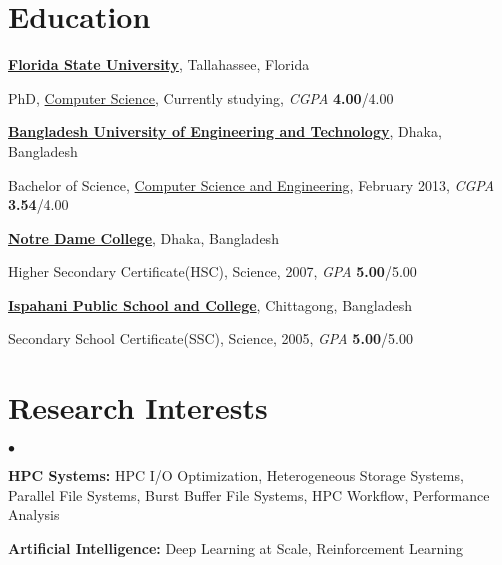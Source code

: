 \documentclass[margin,line]{res}
\newenvironment{list1}{
  \begin{list}{\ding{113}}{%
      \setlength{\itemsep}{0in}
      \setlength{\parsep}{0in} \setlength{\parskip}{0in}
      \setlength{\topsep}{0in} \setlength{\partopsep}{0in} 
      \setlength{\leftmargin}{0.17in}}}{\end{list}}
\newenvironment{list2}{
  \begin{list}{$\bullet$}{%
      \setlength{\itemsep}{0in}
      \setlength{\parsep}{0in} \setlength{\parskip}{0in}
      \setlength{\topsep}{0in} \setlength{\partopsep}{0in} 
      \setlength{\leftmargin}{0.2in}}}{\end{list}}
\begin{document}
\begin{resume}
\section{\sc Education}
{\bf \href{http://www.fsu.edu}{Florida State University}}, Tallahassee, Florida\\
\vspace*{-.15in}
\begin{list1}
\item[] PhD, \href{http://www.cs.fsu.edu/}{Computer Science}, Currently studying, \textit{CGPA} \textbf{4.00}/4.00
\end{list1}
\vspace*{-.15in}
{\bf \href{http://buet.ac.bd}{Bangladesh University of Engineering and Technology}}, Dhaka, Bangladesh\\
\vspace*{-.15in}
\begin{list1}
\item[] Bachelor of Science, \href{http://cse.buet.ac.bd}{Computer Science and Engineering}, February 2013, \textit{CGPA} \textbf{3.54}/4.00
\end{list1}
\vspace*{-.15in}
{\bf \href{http://www.notredamecollege-dhaka.com/}{Notre Dame College}}, Dhaka, Bangladesh\\
\vspace*{-.15in}
\begin{list1}
\item[] Higher Secondary Certificate(HSC), Science, 2007, \textit{GPA} \textbf{5.00}/5.00
\end{list1}
\vspace*{-.15in}
{\bf \href{http://www.ipscctg.edu.bd/}{Ispahani Public School and College}}, Chittagong, Bangladesh\\
\vspace*{-.15in}
\begin{list1}
\item[] Secondary School Certificate(SSC), Science, 2005, \textit{GPA} \textbf{5.00}/5.00
\end{list1}

\vspace*{-.1in}

\section{\sc Research Interests}
\begin{list2}
\item \textbf{HPC Systems:} HPC I/O Optimization, Heterogeneous Storage Systems, Parallel File Systems, Burst Buffer File Systems, HPC Workflow, Performance Analysis
\item \textbf{Artificial Intelligence:} Deep Learning at Scale, Reinforcement Learning
\end{list2}


\end{resume}
\end{document}
